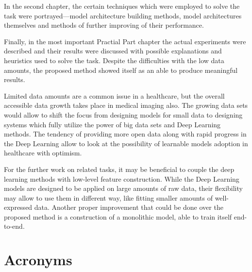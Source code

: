 \documentclass[thesis=B,english]{FITthesis}[2019/12/23]
\begin{document}
In the second chapter, the certain techniques which were employed to solve the task were portrayed---model architecture building methods, model architectures themselves and methods of further improving of their performance.

Finally, in the most important Practial Part chapter the actual experiments were described and their results were discussed with possible explanations and heuristics used to solve the task. Despite the difficulties with the low data amounts, the proposed method showed itself as an able to produce meaningful results.

Limited data amounts are a common issue in a healthcare, but the overall accessible data growth takes place in medical imaging also. The growing data sets would allow to shift the focus from designing models for small data to designing systems which fully utilize the power of big data sets and Deep Learning methods. The tendency of providing more open data along with rapid progress in the Deep Learning allow to look at the possibility of learnable models adoption in healthcare with optimism.

For the further work on related tasks, it may be beneficial to couple the deep learning methods with low-level feature construction. While the Deep Learning models are designed to be applied on large amounts of raw data, their flexibility may allow to use them in different way, like fitting smaller amounts of well-expressed data. Another proper improvement that could be done over the proposed method is a construction of a monolithic model, able to train itself end-to-end.




\appendix

\chapter{Acronyms}
\end{document}
